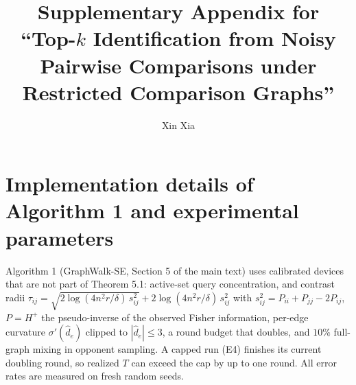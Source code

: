 \documentclass[11pt]{article}
\begin{document}
\title{Supplementary Appendix for\\ ``Top-$k$ Identification from Noisy Pairwise Comparisons under Restricted Comparison Graphs''}
\author{Xin Xia}
\date{}
\maketitle

\section{Implementation details of Algorithm 1 and experimental parameters}
\label{app:impl}
Algorithm 1 (GraphWalk-SE, Section 5 of the main text) uses calibrated devices that are not part of Theorem 5.1: active-set query concentration, and contrast radii
$\tau_{ij}=\sqrt{2\log(4n^2r/\delta)\,s_{ij}^2}+2\log(4n^2r/\delta)\,s_{ij}^2$ with $s_{ij}^2=P_{ii}+P_{jj}-2P_{ij}$, $P=H^{+}$ the pseudo-inverse of the observed Fisher information, per-edge curvature $\sigma'(\hat d_e)$ clipped to $|\hat d_e|\le 3$, a round budget that doubles, and $10\%$ full-graph mixing in opponent sampling.  A capped run (E4) finishes its current doubling round, so realized $T$ can exceed the cap by up to one round.  All error rates are measured on fresh random seeds.
\end{document}
